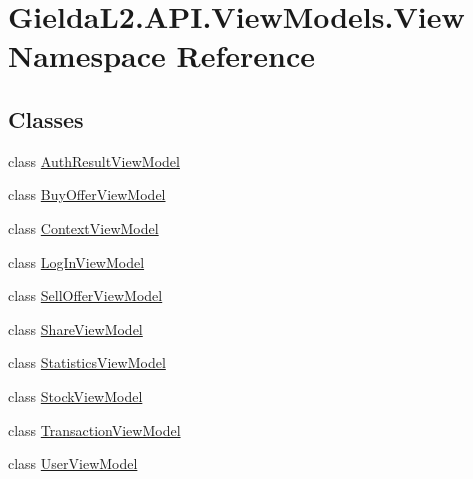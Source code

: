 \hypertarget{namespace_gielda_l2_1_1_a_p_i_1_1_view_models_1_1_view}{}\section{Gielda\+L2.\+A\+P\+I.\+View\+Models.\+View Namespace Reference}
\label{namespace_gielda_l2_1_1_a_p_i_1_1_view_models_1_1_view}
\subsection*{Classes}
\begin{DoxyCompactItemize}
\item 
class \mbox{\hyperlink{class_gielda_l2_1_1_a_p_i_1_1_view_models_1_1_view_1_1_auth_result_view_model}{Auth\+Result\+View\+Model}}
\item 
class \mbox{\hyperlink{class_gielda_l2_1_1_a_p_i_1_1_view_models_1_1_view_1_1_buy_offer_view_model}{Buy\+Offer\+View\+Model}}
\item 
class \mbox{\hyperlink{class_gielda_l2_1_1_a_p_i_1_1_view_models_1_1_view_1_1_context_view_model}{Context\+View\+Model}}
\item 
class \mbox{\hyperlink{class_gielda_l2_1_1_a_p_i_1_1_view_models_1_1_view_1_1_log_in_view_model}{Log\+In\+View\+Model}}
\item 
class \mbox{\hyperlink{class_gielda_l2_1_1_a_p_i_1_1_view_models_1_1_view_1_1_sell_offer_view_model}{Sell\+Offer\+View\+Model}}
\item 
class \mbox{\hyperlink{class_gielda_l2_1_1_a_p_i_1_1_view_models_1_1_view_1_1_share_view_model}{Share\+View\+Model}}
\item 
class \mbox{\hyperlink{class_gielda_l2_1_1_a_p_i_1_1_view_models_1_1_view_1_1_statistics_view_model}{Statistics\+View\+Model}}
\item 
class \mbox{\hyperlink{class_gielda_l2_1_1_a_p_i_1_1_view_models_1_1_view_1_1_stock_view_model}{Stock\+View\+Model}}
\item 
class \mbox{\hyperlink{class_gielda_l2_1_1_a_p_i_1_1_view_models_1_1_view_1_1_transaction_view_model}{Transaction\+View\+Model}}
\item 
class \mbox{\hyperlink{class_gielda_l2_1_1_a_p_i_1_1_view_models_1_1_view_1_1_user_view_model}{User\+View\+Model}}
\end{DoxyCompactItemize}
